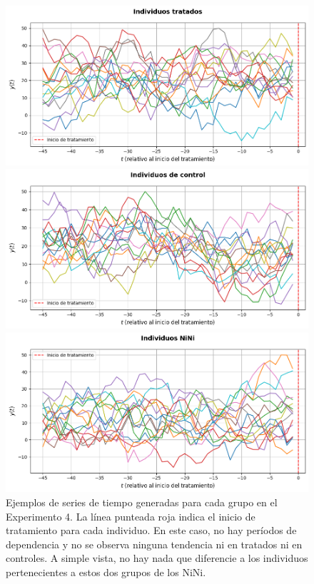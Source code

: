 \documentclass[../../main.tex]{subfiles}
\begin{document}
\begin{figure}[H]
    \centering
    \begin{minipage}{0.48\textwidth}
        \centering
        \includegraphics[scale=0.3]{figs/Exp4/tratados_sim13.png}
    \end{minipage}
    \hfill
    \begin{minipage}{0.48\textwidth}
        \centering
        \includegraphics[scale=0.3]{figs/Exp4/controles_sim13.png}
    \end{minipage}
    \vspace{0.5em}
    \begin{minipage}{0.6\textwidth}
        \centering
        \includegraphics[scale=0.3]{figs/Exp4/ninis_sim13.png}
    \end{minipage}
    \caption{Ejemplos de series de tiempo generadas para cada grupo en el Experimento 4.
    La línea punteada roja indica el inicio de tratamiento para cada individuo. En este
    caso, no hay períodos de dependencia y no se observa ninguna tendencia ni en tratados
    ni en controles. A simple vista, no hay nada que diferencie a los individuos
    pertenecientes a estos dos grupos de los NiNi.}
    \label{fig:time_series_exp4}
\end{figure}
\end{document}
